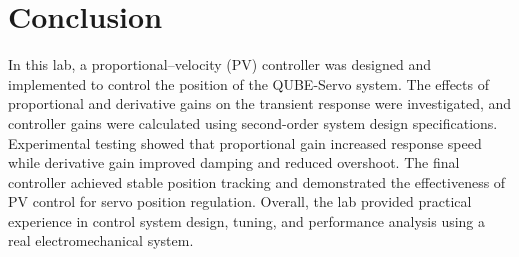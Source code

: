 \documentclass[11pt]{article}
\begin{document}
\section{Conclusion}
In this lab, a proportional--velocity (PV) controller was designed and implemented to
control the position of the QUBE-Servo system. The effects of proportional and derivative
gains on the transient response were investigated, and controller gains were calculated
using second-order system design specifications. Experimental testing showed that
proportional gain increased response speed while derivative gain improved damping and
reduced overshoot. The final controller achieved stable position tracking and demonstrated
the effectiveness of PV control for servo position regulation. Overall, the lab provided
practical experience in control system design, tuning, and performance analysis using a real
electromechanical system.
\end{document}
